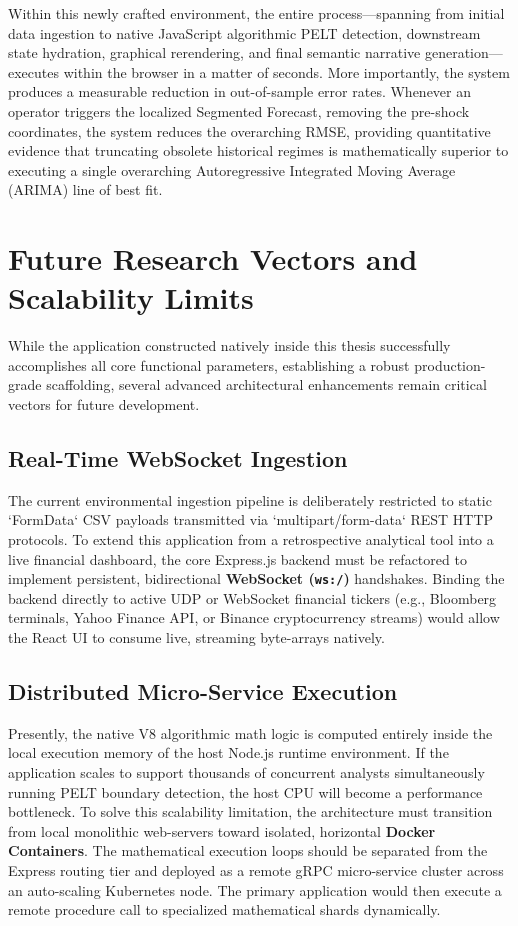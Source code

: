 Within this newly crafted environment, the entire process—spanning from initial data ingestion to native JavaScript algorithmic PELT detection, downstream state hydration, graphical rerendering, and final semantic narrative generation—executes within the browser in a matter of seconds. More importantly, the system produces a measurable reduction in out-of-sample error rates. Whenever an operator triggers the localized Segmented Forecast, removing the pre-shock coordinates, the system reduces the overarching RMSE, providing quantitative evidence that truncating obsolete historical regimes is mathematically superior to executing a single overarching Autoregressive Integrated Moving Average (ARIMA) line of best fit.

\section{Future Research Vectors and Scalability Limits}
While the application constructed natively inside this thesis successfully accomplishes all core functional parameters, establishing a robust production-grade scaffolding, several advanced architectural enhancements remain critical vectors for future development. 

\subsection{Real-Time WebSocket Ingestion}
The current environmental ingestion pipeline is deliberately restricted to static `FormData` CSV payloads transmitted via `multipart/form-data` REST HTTP protocols. To extend this application from a retrospective analytical tool into a live financial dashboard, the core Express.js backend must be refactored to implement persistent, bidirectional \textbf{WebSocket (\texttt{ws:/})} handshakes. Binding the backend directly to active UDP or WebSocket financial tickers (e.g., Bloomberg terminals, Yahoo Finance API, or Binance cryptocurrency streams) would allow the React UI to consume live, streaming byte-arrays natively. 

    \subsection{Distributed Micro-Service Execution}
Presently, the native V8 algorithmic math logic is computed entirely inside the local execution memory of the host Node.js runtime environment. If the application scales to support thousands of concurrent analysts simultaneously running PELT boundary detection, the host CPU will become a performance bottleneck. To solve this scalability limitation, the architecture must transition from local monolithic web-servers toward isolated, horizontal \textbf{Docker Containers}. The mathematical execution loops should be separated from the Express routing tier and deployed as a remote gRPC micro-service cluster across an auto-scaling Kubernetes node. The primary application would then execute a remote procedure call to specialized mathematical shards dynamically. 

